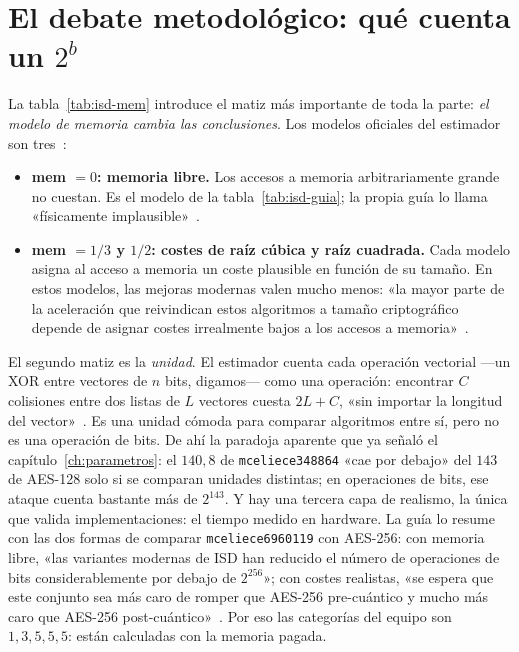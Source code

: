 \section{El debate metodológico: qué cuenta un $2^b$}

La tabla~\ref{tab:isd-mem} introduce el matiz más importante de toda
la parte: \emph{el modelo de memoria cambia las conclusiones}. Los
modelos oficiales del estimador son tres~\cite{esserbellini2022}:

\begin{itemize}[leftmargin=1.5em,itemsep=3pt]
  \item \textbf{mem $=0$: memoria libre.} Los accesos a memoria
        arbitrariamente grande no cuestan. Es el modelo de la
        tabla~\ref{tab:isd-guia}; la propia guía lo llama
        «físicamente implausible»~\cite{cmsecurity}.
  \item \textbf{mem $=1/3$ y $1/2$: costes de raíz cúbica y raíz
        cuadrada.} Cada modelo asigna al acceso a memoria un coste
        plausible en función de su tamaño. En estos modelos, las
        mejoras modernas valen mucho menos: «la mayor parte de la
        aceleración que reivindican estos algoritmos a tamaño
        criptográfico depende de asignar costes irrealmente bajos a
        los accesos a memoria»~\cite{cmsecurity}.
\end{itemize}

El segundo matiz es la \emph{unidad}. El estimador cuenta cada
operación vectorial ---un XOR entre vectores de $n$ bits, digamos---
como una operación: encontrar $C$ colisiones entre dos listas de $L$
vectores cuesta $2L+C$, «sin importar la longitud del
vector»~\cite{cmsecurity}. Es una unidad cómoda para comparar
algoritmos entre sí, pero no es una operación de bits. De ahí la
paradoja aparente que ya señaló el capítulo~\ref{ch:parametros}: el
$140{,}8$ de \texttt{mceliece348864} «cae por debajo» del $143$ de
AES-128 solo si se comparan unidades distintas; en operaciones de
bits, ese ataque cuenta bastante más de $2^{143}$. Y hay una tercera
capa de realismo, la única que valida implementaciones: el tiempo
medido en hardware. La guía lo resume con las dos formas de comparar
\texttt{mceliece6960119} con AES-256: con memoria libre, «las
variantes modernas de ISD han reducido el número de operaciones de
bits considerablemente por debajo de $2^{256}$»; con costes
realistas, «se espera que este conjunto sea más caro de romper que
AES-256 pre-cuántico y mucho más caro que AES-256
post-cuántico»~\cite{cmsecurity}. Por eso las categorías del equipo
son $1,3,5,5,5$: están calculadas con la memoria pagada.


